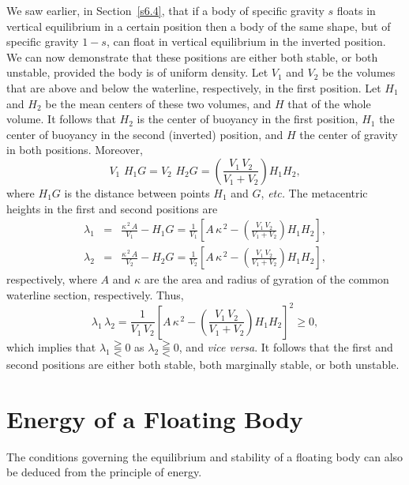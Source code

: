 We saw earlier, in Section~\ref{s6.4}, that if a body of  specific gravity $s$ floats in vertical equilibrium in a certain position
then a body of the same shape, but of specific gravity $1-s$, can float in vertical equilibrium in  the inverted position. We can now
demonstrate that these positions are either both stable, or both unstable, provided the body is
of uniform density. Let $V_1$ and $V_2$ be
the volumes that are above and below the waterline, respectively, in the first position. Let $H_1$ and
$H_2$ be the mean centers of these two volumes, and $H$ that of the whole volume. It follows that
$H_2$ is the center of buoyancy in the first position, $H_1$ the center of buoyancy in the second (inverted) position, and
$H$ the center of gravity in both positions. Moreover,
\begin{equation}
V_1\,\,H_1G = V_2\,\,H_2G = \left(\frac{V_1\,V_2}{V_1+V_2}\right)H_1H_2,
\end{equation}
where $H_1G$ is the distance between points $H_1$ and $G$, {\em etc.}
The metacentric heights in the first and second positions are
\begin{eqnarray}
\lambda_1 &=& \frac{\kappa^{\,2}\,A}{V_1} - H_1G =\frac{1}{V_1}\left[A\,\kappa^{\,2}- \left(\frac{V_1\,V_2}{V_1+V_2}\right)  H_1H_2\right],\\[0.5ex]
\lambda_2 &=& \frac{\kappa^{\,2}\,A}{V_2} - H_2G =\frac{1}{V_2}\left[A\,\kappa^{\,2}- \left(\frac{V_1\,V_2}{V_1+V_2}\right)H_1H_2\right],
\end{eqnarray}
respectively,
where $A$ and $\kappa$ are the area and radius of gyration of the common waterline section, respectively. 
Thus,
\begin{equation}
\lambda_1\,\lambda_2 = \frac{1}{V_1\,V_2}\left[A\,\kappa^{\,2}- \left(\frac{V_1\,V_2}{V_1+V_2}\right)  H_1H_2\right]^2\geq 0,
\end{equation}
which implies that  $\lambda_1\gtreqqless 0$ as $\lambda_2\gtreqqless 0$, and {\em vice versa}. It follows that the first
and second positions are either both stable,  both marginally stable, or both unstable.

\section{Energy of a Floating Body}
The conditions governing the equilibrium and stability of a floating body can also be deduced from
the principle of energy. 

